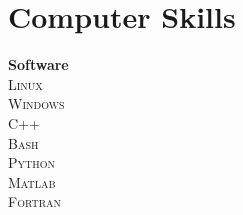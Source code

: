 %
%
\section{Computer Skills}
\begin{minipage}{0.18\textwidth}
\begin{tabular}%
{\large\textbf{Software}}\\
              \textsc{Linux} \\ 
               \textsc{Windows} \\
               \textsc{C++} \\
               \textsc{Bash} \\
               \textsc{Python} \\
               \textsc{Matlab} \\
               \textsc{Fortran} \\
\end{tabular}
\end{minipage}

%

